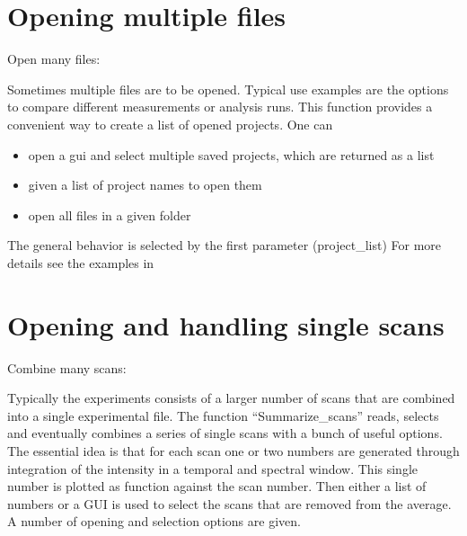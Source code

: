 \documentclass[letterpaper,10pt,english]{sphinxmanual}
\begin{document}
\section{Opening multiple files}
\label{\detokenize{Opening:opening-multiple-files}}
Open many files:                        {\hyperref[\detokenize{plot_func:plot_func.GUI_open}]{}}

Sometimes multiple files are to be opened. Typical use examples are the options to compare different
measurements or analysis runs. This function provides a convenient way to create a list of opened projects.
One can
\begin{itemize}
\item {} 
open a gui and select multiple saved projects, which are returned as a list

\item {} 
given a list of project names to open them

\item {} 
open all files in a given folder

\end{itemize}

The general behavior is selected by the first parameter (project\_list)
For more details see the examples in {\hyperref[\detokenize{plot_func:plot_func.GUI_open}]{}}


\section{Opening and handling single scans}
\label{\detokenize{Opening:opening-and-handling-single-scans}}
Combine many scans:                     {\hyperref[\detokenize{plot_func:plot_func.Summarize_scans}]{}}

Typically the experiments consists of a larger number of scans that are combined into a single experimental file.
The function “Summarize\_scans” reads, selects and eventually combines a
series of single scans with a bunch of useful options. The essential idea is
that for each scan one or two numbers are generated through integration of the intensity
in a temporal and spectral window. This single number is plotted as function against the scan number.
Then either a list of numbers or a GUI is used to select the scans that are
removed from the average. A number of opening and selection options are given.
\end{document}
